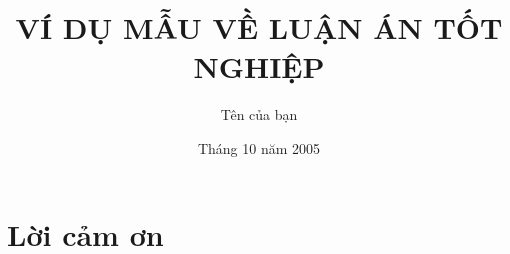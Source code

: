 \documentclass[a4paper]{report}
\begin{document}
\title{VÍ DỤ MẪU VỀ LUẬN ÁN TỐT NGHIỆP}
\author{Tên của bạn}
\date{Tháng 10 năm 2005}

\maketitle

\tableofcontents
\listoffigures
\listoftables

\chapter*{Lời cảm ơn}

\begin{abstract}
\end{abstract}














\end{document}
